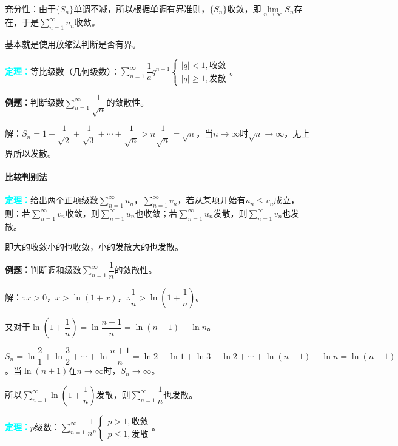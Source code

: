 \documentclass[UTF8, 12pt]{ctexart}
\begin{document}
充分性：由于$\{S_n\}$单调不减，所以根据单调有界准则，$\{S_n\}$收敛，即$\lim\limits_{n\to\infty}S_n$存在，于是$\sum\limits_{n=1}^\infty u_n$收敛。

基本就是使用放缩法判断是否有界。

\textcolor{aqua}{\textbf{定理：}}等比级数（几何级数）：$\sum\limits_{n=1}^\infty\dfrac{1}aq^{n-1}\left\{\begin{array}{l}
    \vert q\vert<1, \text{收敛} \\
    \vert q\vert\geqslant 1, \text{发散}
\end{array}\right.$。

\textbf{例题：}判断级数$\sum\limits_{n=1}^\infty\dfrac{1}{\sqrt{n}}$的敛散性。

解：$S_n=1+\dfrac{1}{\sqrt{2}}+\dfrac{1}{\sqrt{3}}+\cdots+\dfrac{1}{\sqrt{n}}>n\dfrac{1}{\sqrt{n}}=\sqrt{n}$，当$n\to\infty$时$\sqrt{n}\to\infty$，无上界所以发散。

\paragraph{比较判别法} \leavevmode \medskip

\textcolor{aqua}{\textbf{定理：}}给出两个正项级数$\sum\limits_{n=1}^\infty u_n$，$\sum\limits_{n=1}^\infty v_n$，若从某项开始有$u_n\leqslant v_n$成立，则：若$\sum\limits_{n=1}^\infty v_n$收敛，则$\sum\limits_{n=1}^\infty u_n$也收敛；若$\sum\limits_{n=1}^\infty u_n$发散，则$\sum\limits_{n=1}^\infty v_n$也发散。

即大的收敛小的也收敛，小的发散大的也发散。

\textbf{例题：}判断调和级数$\sum\limits_{n=1}^\infty\dfrac{1}{n}$的敛散性。

解：$\because x>0$，$x>\ln(1+x)$，$\therefore\dfrac{1}{n}>\ln\left(1+\dfrac{1}{n}\right)$。

又对于$\ln\left(1+\dfrac{1}{n}\right)=\ln\dfrac{n+1}{n}=\ln(n+1)-\ln n$。

$S_n=\ln\dfrac{2}{1}+\ln\dfrac{3}{2}+\cdots+\ln\dfrac{n+1}{n}=\ln2-\ln1+\ln3-\ln2+\cdots+\ln(n+1)-\ln n=\ln(n+1)$。当$\ln(n+1)$在$n\to\infty$时，$S_n\to\infty$。

所以$\sum\limits_{n=1}^\infty\ln\left(1+\dfrac{1}{n}\right)$发散，则$\sum\limits_{n=1}^\infty\dfrac{1}{n}$也发散。

\textcolor{aqua}{\textbf{定理：}}$p$级数：$\sum\limits_{n=1}^\infty\dfrac{1}{n^p}\left\{\begin{array}{l}
    p>1, \text{收敛} \\
    p\leqslant1, \text{发散}
\end{array}\right.$。
\end{document}
